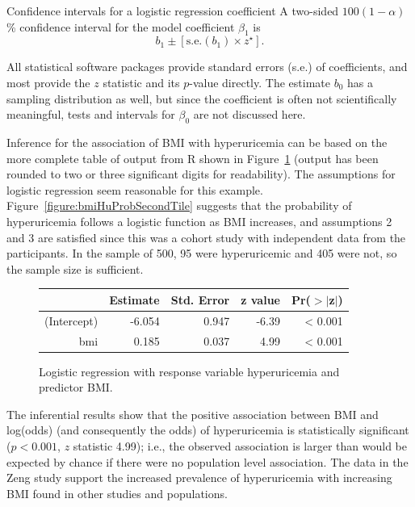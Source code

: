 
\begin{onebox}{Confidence intervals for a logistic regression coefficient}
A two-sided $100(1 - \alpha)$\% confidence interval for the model coefficient $\beta_1$ is
\[
  b_1 \pm [{\textrm{s.e.}(b_1)} \times z^\star].
\]
\end{onebox}

All statistical software packages provide standard errors (s.e.) of coefficients, and most provide the $z$ statistic and its $p$-value directly.  The estimate $b_0$ has a sampling distribution as well, but since the coefficient is often not scientifically meaningful, tests and intervals for $\beta_0$ are not discussed here.

Inference for the association of BMI with hyperuricemia can be based on the more complete table of output from \textsf{R} shown in Figure~\ref{figure:bmiHyperuricemiaLogReg} (output has been rounded to two or three significant digits for readability).  The assumptions for logistic regression seem reasonable for this example. Figure~\ref{figure:bmiHuProbSecondTile} suggests that the probability of hyperuricemia follows a logistic function as BMI increases, and assumptions 2 and 3 are satisfied since this was a cohort study with independent data from the participants. In the sample of 500, 95 were hyperuricemic and 405 were not, so the sample size is sufficient.

\begin{figure}[ht]
\centering
\begin{tabular}{rrrrr}
  \hline
 & Estimate & Std. Error & z value & Pr($>$$|$z$|$) \\
  \hline
(Intercept) & -6.054 & 0.947 & -6.39 & < 0.001 \\
  bmi & 0.185 & 0.037 & 4.99 & < 0.001 \\
   \hline
\end{tabular}
\caption{Logistic regression with response variable hyperuricemia
        and predictor BMI.}
\label{figure:bmiHyperuricemiaLogReg}
\end{figure}

The inferential results show that the positive association between BMI and log(odds) (and consequently the odds) of hyperuricemia is statistically significant ($p< 0.001$, $z$ statistic 4.99); i.e., the observed association is larger than would be expected by chance if there were no population level association.  The data in the Zeng study support the increased prevalence of hyperuricemia with increasing BMI found in other studies and populations.

